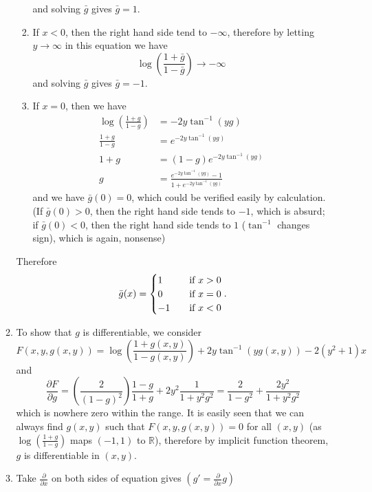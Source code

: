 \begin{enumerate}
\begin{enumerate}
\begin{enumerate}
            and solving $\bar{g}$ gives $\bar{g} = 1$.
            \item If $x < 0$, then the right hand side tend to $-\infty$, therefore by letting $y \to \infty$ in this equation we have
            \[
            \log\left(\frac{1+\bar{g}}{1-\bar{g}}\right) \to -\infty
            \]
            and solving $\bar{g}$ gives $\bar{g} = -1$.
            \item If $x = 0$, then we have
            \begin{align*}
                \log\left(\frac{1+g}{1-g}\right) &= - 2y \tan^{-1}(yg) \\
                \frac{1+g}{1-g} &= e^{- 2y \tan^{-1}(yg)} \\
                1+g &= (1-g) e^{- 2y \tan^{-1}(yg)} \\
                g &= \frac{e^{- 2y \tan^{-1}(yg)} - 1}{1 + e^{- 2y \tan^{-1}(yg)}}
            \end{align*}
            and we have $\bar{g}(0) = 0$, which could be verified easily by calculation. \\
            (If $\bar{g}(0) > 0$, then the right hand side tends to $-1$, which is absurd; if $\bar{g}(0) < 0$, then the right hand side tends to $1$ ($\tan^{-1}$ changes sign), which is again, nonsense) 
        \end{enumerate}
        Therefore
        \[\bar{g}(x) = \begin{cases}
        1 &\text{\quad if } x > 0 \\
        0 &\text{\quad if } x = 0 \\
        -1 &\text{\quad if } x < 0 \\
        \end{cases}.\]
        \item To show that $g$ is differentiable, we consider
        \[
        F(x,y,g(x,y)) = \log\left(\frac{1+g(x,y)}{1-g(x,y)}\right) + 2y \tan^{-1}(yg(x,y)) - 2(y^2+1)x
        \]
        and
        \[
        \frac{\partial F}{\partial g} = \left( \frac{2}{(1-g)^2} \right) \frac{1-g}{1+g} + 2y^2 \frac{1}{1+y^2g^2} = \frac{2}{1-g^2} + \frac{2y^2}{1+y^2g^2} 
        \]
        which is nowhere zero within the range. It is easily seen that we can always find $g(x,y)$ such that $F(x,y,g(x,y)) = 0$ for all $(x,y)$ (as $\log(\frac{1+g}{1-g})$ maps $(-1,1)$ to $\mathbb{R}$), therefore by implicit function theorem, $g$ is differentiable in $(x,y)$.
        \item Take $\frac{\partial}{\partial x}$ on both sides of equation gives $(g' = \frac{\partial}{\partial x}g)$

\end{enumerate}
\end{enumerate}
